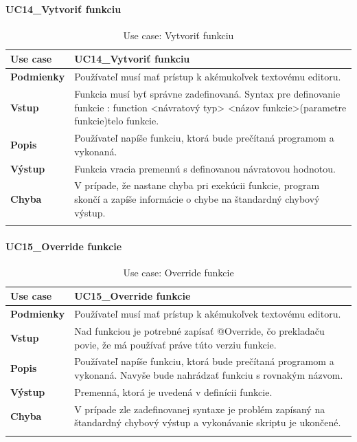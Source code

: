 \paragraph{UC14\_Vytvoriť funkciu}
\begin{center}
	\begin{longtable}{|p{2.5cm}|p{12.2cm}|}
		
			\hline
			\textbf{Use case} & UC14\_Vytvoriť funkciu \\ 
			\hline
			\textbf{Podmienky} & Používateľ musí mať prístup k akémukoľvek textovému editoru.  \\ 
			\hline
			\textbf{Vstup} & Funkcia musí byť správne zadefinovaná. 
			Syntax pre definovanie funkcie : 
			\newline
			function <návratový typ> <názov funkcie>(parametre funkcie){telo funkcie}. \\
			\hline
			
			\textbf{Popis} & Používateľ napíše funkciu, ktorá bude prečítaná programom a vykonaná.\\ 
			\hline

			\textbf{Výstup} & Funkcia vracia premennú s definovanou návratovou hodnotou.\\
			\hline
			\textbf{Chyba} & V prípade, že nastane chyba pri exekúcii funkcie, program skončí a zapíše informácie o chybe na štandardný chybový výstup.\\
			\hline
		\caption{Use case: Vytvoriť funkciu}
		\label{table:1}
		
	\end{longtable}
\end{center}
\paragraph{UC15\_Override funkcie}
\begin{center}
	\begin{longtable}{|p{2.5cm}|p{12.2cm}|}
		
			\hline
			\textbf{Use case} & UC15\_Override funkcie \\ 
			\hline
			\textbf{Podmienky} & Používateľ musí mať prístup k akémukoľvek textovému editoru.  \\ 
			\hline
			\textbf{Vstup} & Nad funkciou je potrebné zapísať @Override,  čo prekladaču povie, že má používať práve túto verziu funkcie.\\
			\hline
			
			\textbf{Popis} & Používateľ napíše funkciu, ktorá bude prečítaná programom a vykonaná. Navyše bude nahrádzať funkciu s rovnakým názvom.\\ 
			\hline
			\textbf{Výstup} & Premenná, ktorá je uvedená v definícii funkcie.\\
			\hline
			\textbf{Chyba} & V prípade zle zadefinovanej syntaxe je problém zapísaný na štandardný chybový výstup a vykonávanie skriptu je ukončené.\\
			\hline
		\caption{Use case: Override funkcie}
		\label{table:1}
		
	\end{longtable}
\end{center}
